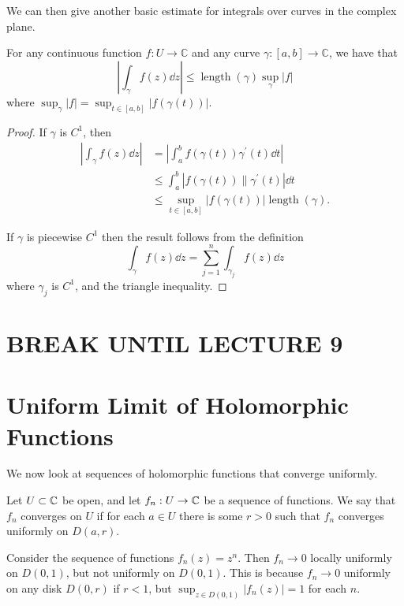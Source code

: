 \documentclass[a4paper]{scrartcl}
\begin{document}
We can then give another basic estimate for integrals over curves in the complex plane.

\begin{proposition}
    For any continuous function $f: U \rightarrow \mathbb{C}$ and any curve $\gamma:[a, b] \rightarrow \mathbb{C}$, we have that
    $$
    \left|\int_{\gamma} f(z) \dd z\right| \leq \operatorname{length}(\gamma) \sup _{\gamma}|f|
    $$
    where $\sup _{\gamma}|f|=\sup _{t \in[a, b]}|f(\gamma(t))|$.
\end{proposition}
\begin{proof}
If $\gamma$ is $C^{1}$, then 
\begin{align*}
\left|\int_{\gamma} f(z) \dd z\right|&=\left|\int_{a}^{b} f(\gamma(t)) \gamma^{\prime}(t) \dd t\right| \\
&\leq\int_{a}^{b}\left|f(\gamma(t)) \| \gamma^{\prime}(t)\right| \dd t \\
&\leq \sup _{t \in[a, b]}|f(\gamma(t))| \operatorname{length}(\gamma).
\end{align*} 

If $\gamma$ is piecewise $C^{1}$ then the result follows from the definition 
$$\int_{\gamma} f(z) \dd z=\sum_{j=1}^{n} \int_{\gamma_{j}} f(z) \dd z$$ 
where $\gamma_{j}$ is $C^{1}$, and the triangle inequality.
\end{proof}

\section{BREAK UNTIL LECTURE 9}

\section{Uniform Limit of Holomorphic Functions}

We now look at sequences of holomorphic functions that converge uniformly.

\begin{definition}
    Let $U \subset \mathbb{C}$ be open, and let $f_n : U \rightarrow \mathbb{C}$ be a sequence 
    of functions. We say that $f_n$ converges  on $U$ if for each $a \in U$ there is some $r > 0$ such that $f_n$ converges uniformly on $D(a, r)$.
\end{definition}

\begin{example}
    Consider the sequence of functions $f_n(z) = z^n$. Then $f_n \rightarrow 0$ locally uniformly on $D(0, 1)$, but not uniformly on $D(0, 1)$. This is because $f_n \rightarrow 0$ uniformly on any disk $D(0, r)$ if $r < 1$, but $\sup_{z \in D(0, 1)} |f_n(z)| = 1$ for each $n$.
\end{example}
\end{document}
